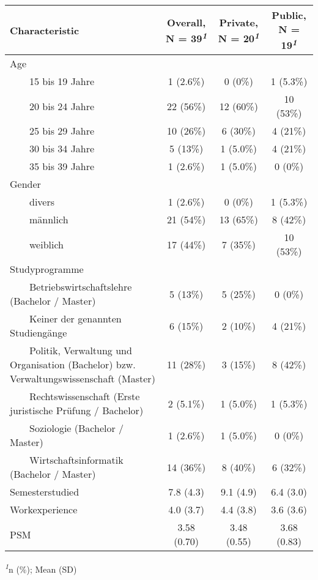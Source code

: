 \setlength{\LTpost}{0mm}
\begin{longtable}{lccc}
\toprule
\textbf{Characteristic} & \textbf{Overall}, N = 39\textsuperscript{\textit{1}} & \textbf{Private}, N = 20\textsuperscript{\textit{1}} & \textbf{Public}, N = 19\textsuperscript{\textit{1}} \\ 
\midrule\addlinespace[2.5pt]
Age &  &  &  \\ 
    15 bis 19 Jahre & 1 (2.6\%) & 0 (0\%) & 1 (5.3\%) \\ 
    20 bis 24 Jahre & 22 (56\%) & 12 (60\%) & 10 (53\%) \\ 
    25 bis 29 Jahre & 10 (26\%) & 6 (30\%) & 4 (21\%) \\ 
    30 bis 34 Jahre & 5 (13\%) & 1 (5.0\%) & 4 (21\%) \\ 
    35 bis 39 Jahre & 1 (2.6\%) & 1 (5.0\%) & 0 (0\%) \\ 
Gender &  &  &  \\ 
    divers & 1 (2.6\%) & 0 (0\%) & 1 (5.3\%) \\ 
    männlich & 21 (54\%) & 13 (65\%) & 8 (42\%) \\ 
    weiblich & 17 (44\%) & 7 (35\%) & 10 (53\%) \\ 
Studyprogramme &  &  &  \\ 
    Betriebswirtschaftslehre (Bachelor / Master) & 5 (13\%) & 5 (25\%) & 0 (0\%) \\ 
    Keiner der genannten Studiengänge & 6 (15\%) & 2 (10\%) & 4 (21\%) \\ 
    Politik, Verwaltung und Organisation (Bachelor) bzw. Verwaltungswissenschaft (Master) & 11 (28\%) & 3 (15\%) & 8 (42\%) \\ 
    Rechtswissenschaft (Erste juristische Prüfung / Bachelor) & 2 (5.1\%) & 1 (5.0\%) & 1 (5.3\%) \\ 
    Soziologie (Bachelor / Master) & 1 (2.6\%) & 1 (5.0\%) & 0 (0\%) \\ 
    Wirtschaftsinformatik (Bachelor / Master) & 14 (36\%) & 8 (40\%) & 6 (32\%) \\ 
Semesterstudied & 7.8 (4.3) & 9.1 (4.9) & 6.4 (3.0) \\ 
Workexperience & 4.0 (3.7) & 4.4 (3.8) & 3.6 (3.6) \\ 
PSM & 3.58 (0.70) & 3.48 (0.55) & 3.68 (0.83) \\ 
\bottomrule
\end{longtable}
\begin{minipage}{\linewidth}
\textsuperscript{\textit{1}}n (\%); Mean (SD)\\
\end{minipage}

